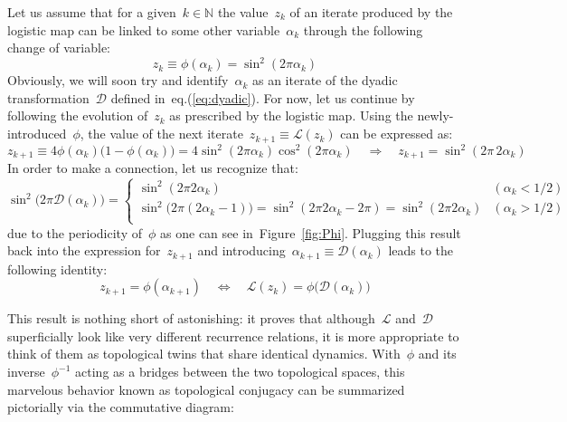 \documentclass{article}
\begin{document}
Let us assume that for a given~$k \in \mathbb{N}$ the value~$z_k$ of an iterate produced by the logistic map can be linked to some other variable~$\alpha_k$ through the following change of variable:
\begin{equation}
z_k \equiv \phi(\alpha_k) = \sin^2(2\pi \alpha_k)
\label{eq::definePhi}
\end{equation}
Obviously, we will soon try and identify~$\alpha_k$ as an iterate of the dyadic transformation~$\mathcal{D}$ defined in~eq.(\ref{eq:dyadic}).  For now, let us continue by following the evolution of~$z_k$ as prescribed by the logistic map.  Using the newly-introduced~$\phi$, the value of the next iterate~$z_{k+1} \equiv \mathcal{L}(z_k)$ can be expressed as:
\begin{equation*}
z_{k+1} \equiv 4 \phi(\alpha_k) \big( 1 - \phi(\alpha_k) \big) = 4 \sin^2(2\pi \alpha_k) \cos^2(2\pi \alpha_k) \quad \Longrightarrow \quad z_{k+1} = \sin^2 \left( 2\pi \, 2\alpha_k \right)
\end{equation*}
In order to make a connection, let us recognize that:
\begin{equation*}
\sin^2 \big( 2\pi \mathcal{D}(\alpha_k) \big) = 
\begin{cases}
\sin^2 \left( 2\pi 2\alpha_k \right) & (\alpha_k < 1/2) \\
\sin^2 \big( 2\pi (2\alpha_k  - 1)  \big) = \sin^2 \left( 2\pi 2\alpha_k - 2\pi \right) =  \sin^2 \left( 2\pi 2\alpha_k \right) & (\alpha_k > 1/2) \\
\end{cases}
\end{equation*}
due to the periodicity of~$\phi$ as one can see in~Figure~\ref{fig:Phi}.  Plugging this result back into the expression for~$z_{k+1}$ and introducing~$\alpha_{k+1} \equiv \mathcal{D}(\alpha_k)$ leads to the following identity:
\begin{equation*}
z_{k+1} = \phi(\alpha_{k+1})  \quad \Leftrightarrow \quad \mathcal{L}(z_k) = \phi \big( \mathcal{D}(\alpha_k) \big)
\label{eq:topologicalConjugacy}
\end{equation*}

\noindent This result is nothing short of astonishing: it proves that although~$\mathcal{L}$ and~$\mathcal{D}$ superficially look like very different recurrence relations, it is more appropriate to think of them as topological twins that share identical dynamics.  With~$\phi$ and its inverse~$\phi^{-1}$ acting as a bridges between the two topological spaces, this marvelous behavior known as topological conjugacy can be summarized pictorially via the commutative diagram:
\end{document}
